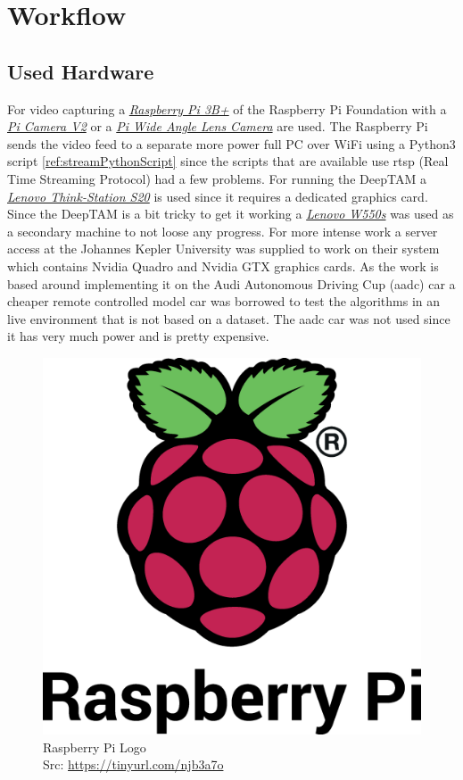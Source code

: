 \chapter{Workflow}


\section{Used Hardware\authorA}
For video capturing a \href{https://www.raspberrypi.org/products/raspberry-pi-3-model-b-plus/}{\textit{Raspberry Pi 3B+}} of the Raspberry Pi Foundation with a \href{https://www.raspberrypi.org/products/camera-module-v2/}{\textit{Pi Camera V2}} or a \href{https://www.sainsmart.com/products/wide-angle-fov160-5-megapixel-camera-module-for-raspberry-pi}{\textit{Pi Wide Angle Lens Camera}} are used. The Raspberry Pi sends the video feed to a separate more power full PC over WiFi using a Python3 script \ref{ref:streamPythonScript} since the scripts that are available use \gls{rtsp} (Real Time Streaming Protocol) had a few problems. \newline
For running the DeepTAM a \href{https://support.lenovo.com/us/en/solutions/pd005642}{\textit{Lenovo Think-Station S20}} is used since it requires a dedicated graphics card. Since the DeepTAM is a bit tricky to get it working a \href{https://www.lenovo.com/de/de/laptops/thinkpad/w-series/w550s/}{\textit{Lenovo W550s}} was used as a secondary machine to not loose any progress. For more intense work a server access at the Johannes Kepler University was supplied to work on their system which contains Nvidia Quadro and Nvidia GTX graphics cards. \newline
As the work is based around implementing it on the Audi Autonomous Driving Cup (\gls{aadc}) car a cheaper remote controlled model car was borrowed to test the algorithms in an live environment that is not based on a dataset. The \gls{aadc} car was not used since it has very much power and is pretty expensive.\newline
\begin{figure}[h]
	\centering
	\includegraphics[height=0.3\textwidth]{./media/images/rpi_logo.eps}
  	\caption{Raspberry Pi Logo\texttrademark
  	\\Src: \url{https://tinyurl.com/njb3a7o}}
  	\label{picamssetup}
\end{figure}

